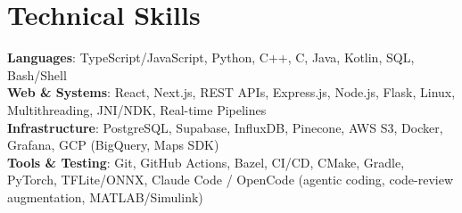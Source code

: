 \documentclass[letterpaper,11pt]{article}
\begin{document}

      \resumeItemListEnd
  
  \resumeSubHeadingListEnd

\section{Technical Skills}
 \resumeSubHeadingListStart
    \small{\item{
        \textbf{Languages}{: TypeScript/JavaScript, Python, C++, C, Java, Kotlin, SQL, Bash/Shell} \\
        \textbf{Web \& Systems}{: React, Next.js, REST APIs, Express.js, Node.js, Flask, Linux, Multithreading, JNI/NDK, Real-time Pipelines} \\
        \textbf{Infrastructure}{: PostgreSQL, Supabase, InfluxDB, Pinecone, AWS S3, Docker, Grafana, GCP (BigQuery, Maps SDK)} \\
\textbf{Tools \& Testing}{: Git, GitHub Actions, Bazel, CI/CD, CMake, Gradle, PyTorch, 
TFLite/ONNX, Claude Code / OpenCode (agentic coding, code-review augmentation, MATLAB/Simulink)} \\    }}
 \resumeSubHeadingListEnd

\end{document}
